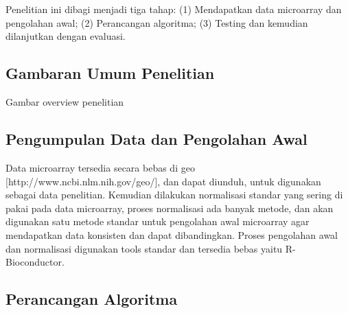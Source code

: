 \chapter{\babTiga}
Penelitian ini dibagi menjadi tiga tahap: (1) Mendapatkan data microarray dan pengolahan awal; (2) Perancangan algoritma; (3) Testing dan kemudian dilanjutkan dengan evaluasi.


\section{Gambaran Umum Penelitian}
Gambar overview penelitian

\section{Pengumpulan Data dan Pengolahan Awal}

Data microarray tersedia secara bebas di geo [http://www.ncbi.nlm.nih.gov/geo/], dan dapat diunduh, untuk digunakan sebagai data penelitian. Kemudian dilakukan normalisasi standar yang sering di pakai pada data microarray, proses normalisasi ada banyak metode, dan akan digunakan satu metode standar untuk pengolahan awal microarray agar mendapatkan data konsisten dan dapat dibandingkan. Proses pengolahan awal dan normalisasi digunakan tools standar dan tersedia bebas yaitu R-Bioconductor.



\section{Perancangan Algoritma}

